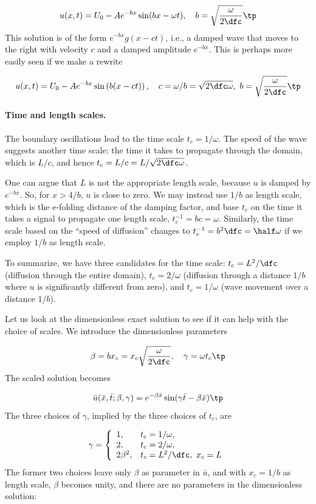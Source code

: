 \documentclass[graybox,envcountchap,sectrefs,final]{svmonodo}
\begin{document}
\begin{equation}
u(x,t) = U_0 - Ae^{-bx}\sin (bx - \omega t),\quad b =\sqrt{\frac{\omega}{2\dfc}}\tp
\label{scale:heat:daynight:sol}
\end{equation}
This solution is of the form $e^{-bx}g(x-ct)$, i.e., a damped wave that
moves to the right with velocity $c$ and a damped amplitude $e^{-bx}$.
This is perhaps more easily seen if we make a rewrite

\[ u(x,t) = U_0 - Ae^{-bx}\sin\left(b(x - ct)\right),\quad
c=\omega/b = \sqrt{2\dfc\omega},\  b =\sqrt{\frac{\omega}{2\dfc}}\tp\]

\paragraph{Time and length scales.}
The boundary oscillations lead to the time scale $t_c=1/\omega$.
The speed of the wave suggests another time scale: the time it
takes to propagate through the domain, which is $L/c$, and
hence $t_c = L/c = L/\sqrt{2\dfc\omega}$.

One can argue that $L$ is not the appropriate length scale, because
$u$ is damped by $e^{-bx}$. So, for $x > 4/b$, $u$ is close to zero.
We may instead use $1/b$ as length scale, which is the e-folding distance of the
damping factor, and base
$t_c$ on the time it takes a signal to propagate one length scale,
$t_c^{-1}=bc=\omega$. Similarly, the time scale based on
the ``speed of diffusion'' changes to
$t_c^{-1}= b^2\dfc = \half\omega$ if we employ $1/b$ as length scale.

To summarize, we have three candidates for the time scale:
$t_c=L^2/\dfc$ (diffusion through the entire domain), $t_c=2/\omega$
(diffusion through a distance $1/b$ where $u$ is significantly
different from zero), and $t_c=1/\omega$ (wave movement over a
distance $1/b$).

Let us look at the dimensionless exact solution to see if it can help
with the choice of scales.  We introduce the dimensionless parameters

\[ \beta = bx_c = x_c\sqrt{\frac{\omega}{2\dfc}},\quad
\gamma = \omega t_c\tp\]
The scaled solution becomes

\[ \bar u(\bar x, \bar t; \beta,\gamma) = e^{-\beta\bar x}\sin(\gamma\bar t- \beta\bar x)\tp\]
The three choices of $\gamma$, implied by the three choices of $t_c$, are

\begin{equation}
\gamma = \left\lbrace\begin{array}{ll}
1, & t_c=1/\omega,\\ 
2, & t_c = 2/\omega,\\ 
2\beta^2, & t_c = L^2/\dfc,\ x_c=L
\end{array}\right.
\label{scale:heat:daynight:gamma3}
\end{equation}
The former two choices leave only $\beta$ as parameter in $\bar u$,
and with $x_c=1/b$ as length scale, $\beta$ becomes unity, and there
are no parameters in the dimensionless solution:
\end{document}
